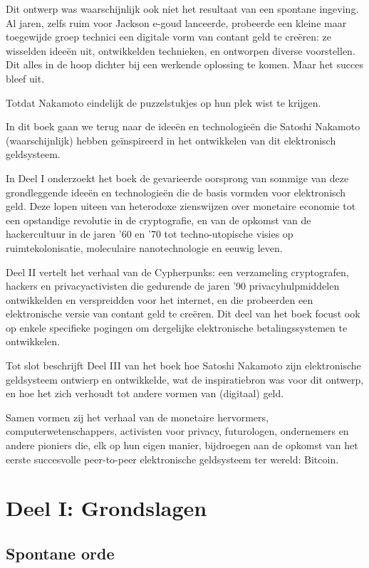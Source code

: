 \documentclass[
  a5paper,
  smalldemyvopaper,11pt,twoside,onecolumn,openright,extrafontsizes]{memoir}
\begin{document}
Dit ontwerp was waarschijnlijk ook niet het resultaat van een spontane
ingeving. Al jaren, zelfs ruim voor Jackson e-goud lanceerde, probeerde
een kleine maar toegewijde groep technici een digitale vorm van contant
geld te creëren: ze wisselden ideeën uit, ontwikkelden technieken, en
ontworpen diverse voorstellen. Dit alles in de hoop dichter bij een
werkende oplossing te komen. Maar het succes bleef uit.

Totdat Nakamoto eindelijk de puzzelstukjes op hun plek wist te krijgen.

In dit boek gaan we terug naar de ideeën en technologieën die Satoshi
Nakamoto (waarschijnlijk) hebben geïnspireerd in het ontwikkelen van dit
elektronisch geldsysteem.

In Deel I onderzoekt het boek de gevarieerde oorsprong van sommige van
deze grondleggende ideeën en technologieën die de basis vormden voor
elektronisch geld. Deze lopen uiteen van heterodoxe zienswijzen over
monetaire economie tot een opstandige revolutie in de cryptografie, en
van de opkomst van de hackercultuur in de jaren '60 en '70 tot
techno-utopische visies op ruimtekolonisatie, moleculaire
nanotechnologie en eeuwig leven.

Deel II vertelt het verhaal van de Cypherpunks: een verzameling
cryptografen, hackers en privacyactivisten die gedurende de jaren '90
privacyhulpmiddelen ontwikkelden en verspreidden voor het internet, en
die probeerden een elektronische versie van contant geld te creëren. Dit
deel van het boek focust ook op enkele specifieke pogingen om dergelijke
elektronische betalingssystemen te ontwikkelen.

Tot slot beschrijft Deel III van het boek hoe Satoshi Nakamoto zijn
elektronische geldsysteem ontwierp en ontwikkelde, wat de inspiratiebron
was voor dit ontwerp, en hoe het zich verhoudt tot andere vormen van
(digitaal) geld.

Samen vormen zij het verhaal van de monetaire hervormers,
computerwetenschappers, activisten voor privacy, futurologen,
ondernemers en andere pioniers die, elk op hun eigen manier, bijdroegen
aan de opkomst van het eerste succesvolle peer-to-peer elektronische
geldsysteem ter wereld: Bitcoin.

\part{Deel I: Grondslagen}

\chapter{Spontane orde}\label{spontane-orde}
\end{document}
